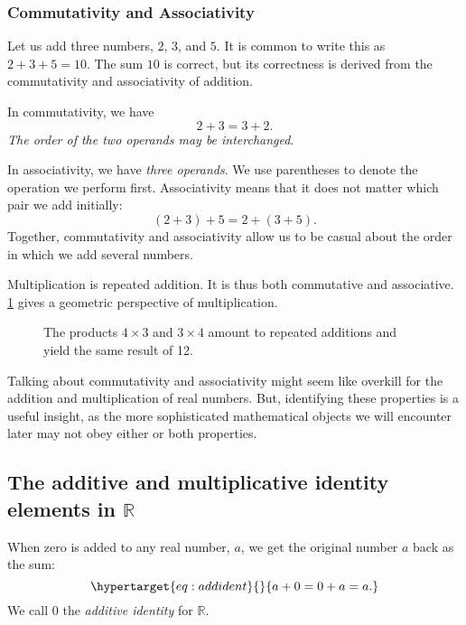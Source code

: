 \documentclass[
  a4paper,
]{article}
\begin{document}
\hypertarget{commutativity-and-associativity}{%
\subsubsection{Commutativity and
Associativity}\label{commutativity-and-associativity}}

Let us add three numbers, \(2\), \(3\), and \(5\). It is common to write
this as \(2 + 3 + 5 = 10\). The sum \(10\) is correct, but its
correctness is derived from the commutativity and associativity of
addition.

In commutativity, we have \[
2 + 3 = 3 + 2.
\] \emph{The order of the two operands may be interchanged}.

In associativity, we have \emph{three operands}. We use parentheses to
denote the operation we perform first. Associativity means that it does
not matter which pair we add initially: \[
(2 + 3) + 5 = 2 + (3 + 5).
\] Together, commutativity and associativity allow us to be casual about
the order in which we add several numbers.

Multiplication is repeated addition. It is thus both commutative and
associative. \cref{fig:mult} gives a geometric perspective of
multiplication.

\begin{figure}
\hypertarget{fig:mult}{%
\centering

\caption{The products \(4\times3\) and \(3\times4\) amount to repeated
additions and yield the same result of 12.}\label{fig:mult}
}
\end{figure}

Talking about commutativity and associativity might seem like overkill
for the addition and multiplication of real numbers. But, identifying
these properties is a useful insight, as the more sophisticated
mathematical objects we will encounter later may not obey either or both
properties.

\hypertarget{the-additive-and-multiplicative-identity-elements-in-mathbbr}{%
\subsection{\texorpdfstring{The additive and multiplicative identity
elements in
\(\mathbb{R}\)}{The additive and multiplicative identity elements in \textbackslash mathbb\{R\}}}\label{the-additive-and-multiplicative-identity-elements-in-mathbbr}}

When zero is added to any real number, \(a\), we get the original number
\(a\) back as the sum:
\begin{equation}\protect\hypertarget{eq:addident}{}{
a + 0 = 0 + a = a.
}\label{eq:addident}\end{equation} We call \(0\) the \emph{additive
identity} for \(\mathbb{R}\).
\end{document}
